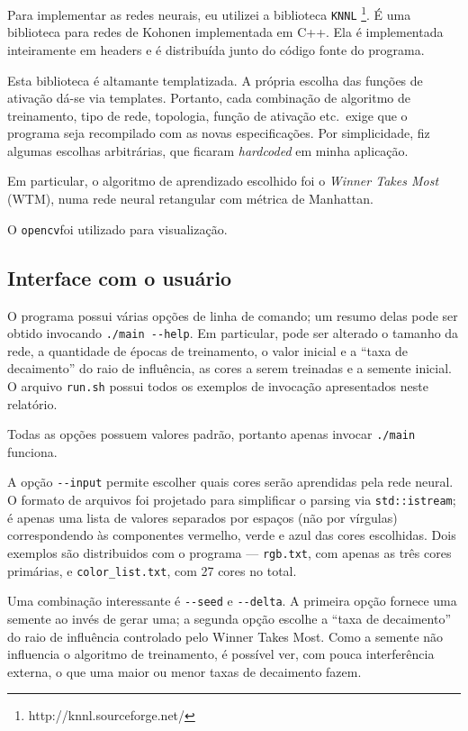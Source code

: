 \documentclass{article}
\newcommand{\KNNL}{{\lstinline"KNNL"}}
\newcommand{\opencv}{{\lstinline"opencv"}}
\begin{document}
Para implementar as redes neurais, eu utilizei a biblioteca \KNNL%
\footnote{
    http://knnl.sourceforge.net/
}.
É uma biblioteca para redes de Kohonen implementada em C++.
Ela é implementada inteiramente em headers
e é distribuída junto do código fonte do programa.

Esta biblioteca é altamante templatizada.
A própria escolha das funções de ativação dá-se via templates.
Portanto, cada combinação de algoritmo de treinamento,
tipo de rede, topologia, função de ativação etc.\ exige
que o programa seja recompilado com as novas especificações.
Por simplicidade,
fiz algumas escolhas arbitrárias,
que ficaram \emph{hardcoded} em minha aplicação.

Em particular, o algoritmo de aprendizado escolhido foi o
\emph{Winner Takes Most} (WTM),
numa rede neural retangular com métrica de Manhattan.

O \opencv foi utilizado para visualização.

\subsection{Interface com o usuário}

O programa possui várias opções de linha de comando;
um resumo delas pode ser obtido invocando \lstinline"./main --help".
Em particular, pode ser alterado
o tamanho da rede,
a quantidade de épocas de treinamento,
o valor inicial e a ``taxa de decaimento'' do raio de influência,
as cores a serem treinadas
e a semente inicial.
O arquivo \lstinline"run.sh" possui todos os exemplos de invocação
apresentados neste relatório.

Todas as opções possuem valores padrão,
portanto apenas invocar \lstinline"./main" funciona.

A opção \lstinline"--input" permite escolher quais cores
serão aprendidas pela rede neural.
O formato de arquivos foi projetado
para simplificar o parsing via \lstinline"std::istream";
é apenas uma lista de valores separados por espaços
(não por vírgulas)
correspondendo às componentes vermelho, verde e azul das cores escolhidas.
Dois exemplos são distribuidos com o programa
--- \lstinline"rgb.txt", com apenas as três cores primárias,
e \lstinline"color_list.txt", com 27 cores no total.

Uma combinação interessante é \lstinline"--seed" e \lstinline"--delta".
A primeira opção fornece uma semente ao invés de gerar uma;
a segunda opção escolhe a ``taxa de decaimento''
do raio de influência controlado pelo Winner Takes Most.
Como a semente não influencia o algoritmo de treinamento,
é possível ver, com pouca interferência externa,
o que uma maior ou menor taxas de decaimento fazem.
\end{document}
